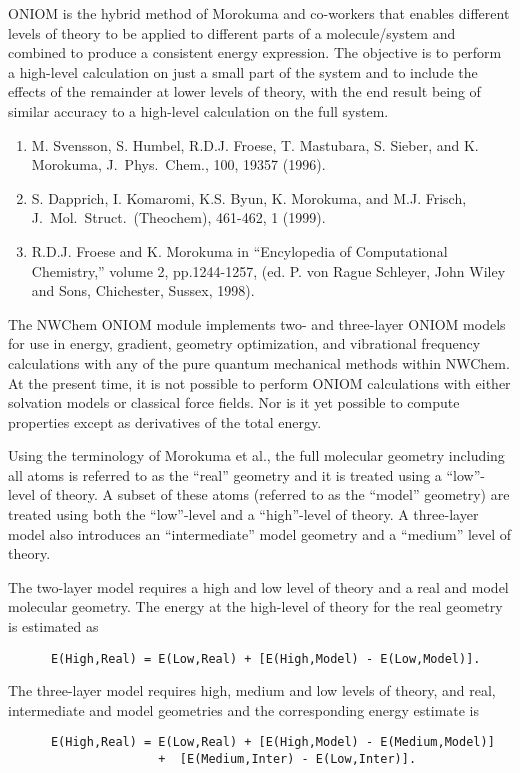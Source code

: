 \label{sec:oniom}

ONIOM is the hybrid method of Morokuma and co-workers that enables
different levels of theory to be applied to different parts of a
molecule/system and combined to produce a consistent energy
expression.  The objective is to perform a high-level calculation on
just a small part of the system and to include the effects of the
remainder at lower levels of theory, with the end result being of
similar accuracy to a high-level calculation on the full system.

\begin{enumerate}
\item M. Svensson, S. Humbel, R.D.J. Froese, T. Mastubara, S. Sieber, and
K. Morokuma, J.~Phys.~Chem., 100, 19357 (1996).
\item  S. Dapprich, I. Komaromi, K.S. Byun, K. Morokuma, and M.J. Frisch,
J.~Mol.~Struct.~(Theochem), 461-462, 1 (1999).
\item R.D.J. Froese and K. Morokuma in ``Encylopedia of Computational Chemistry,'' 
volume 2, pp.1244-1257, (ed. P. von Rague Schleyer, John Wiley and Sons, 
Chichester, Sussex, 1998).
\end{enumerate}

The NWChem ONIOM module implements two- and three-layer ONIOM models
for use in energy, gradient, geometry optimization, and vibrational
frequency calculations with any of the pure quantum mechanical methods
within NWChem.  At the present time, it is not possible to perform
ONIOM calculations with either solvation models or classical force
fields.  Nor is it yet possible to compute properties except as
derivatives of the total energy.  

Using the terminology of Morokuma et al., the full molecular geometry
including all atoms is referred to as the ``real'' geometry and it is
treated using a ``low''-level of theory.  A subset of these atoms
(referred to as the ``model'' geometry) are treated using both the
``low''-level and a ``high''-level of theory.  A three-layer model
also introduces an ``intermediate'' model geometry and a ``medium''
level of theory.

The two-layer model requires a high and low level of theory and a
real and model molecular geometry.  The energy at the high-level of
theory for the real geometry is estimated as
\begin{verbatim}
      E(High,Real) = E(Low,Real) + [E(High,Model) - E(Low,Model)].
\end{verbatim}
The three-layer model requires high, medium and low levels of theory,
and real, intermediate and model geometries and the corresponding
energy estimate is
\begin{verbatim}
      E(High,Real) = E(Low,Real) + [E(High,Model) - E(Medium,Model)]
                     +  [E(Medium,Inter) - E(Low,Inter)].
\end{verbatim}

